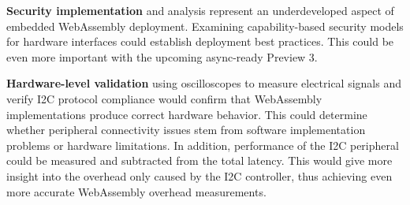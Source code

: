 \textbf{Security implementation} and analysis represent an underdeveloped aspect of embedded WebAssembly deployment. Examining capability-based security models for hardware interfaces could establish deployment best practices. This could be even more important with the upcoming async-ready Preview 3.

\textbf{Hardware-level validation} using oscilloscopes to measure electrical signals and verify I2C protocol compliance would confirm that WebAssembly implementations produce correct hardware behavior. This could determine whether peripheral connectivity issues stem from software implementation problems or hardware limitations. In addition, performance of the I2C peripheral could be measured and subtracted from the total latency. This would give more insight into the overhead only caused by the I2C controller, thus achieving even more accurate WebAssembly overhead measurements.







































